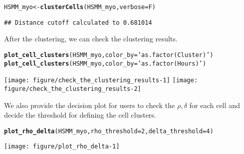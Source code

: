 \documentclass[10pt,oneside]{article}\usepackage[]{graphicx}\usepackage[]{color}
\makeatletter
\def\maxwidth{ %
  \ifdim\Gin@nat@width>\linewidth
    \linewidth
  \else
    \Gin@nat@width
  \fi
}
\newcommand{\hlnum}[1]{\textcolor[rgb]{0.686,0.059,0.569}{#1}}%
\newcommand{\hlstr}[1]{\textcolor[rgb]{0.192,0.494,0.8}{#1}}%
\newcommand{\hlstd}[1]{\textcolor[rgb]{0.345,0.345,0.345}{#1}}%
\newcommand{\hlkwb}[1]{\textcolor[rgb]{0.69,0.353,0.396}{#1}}%
\newcommand{\hlkwc}[1]{\textcolor[rgb]{0.333,0.667,0.333}{#1}}%
\newcommand{\hlkwd}[1]{\textcolor[rgb]{0.737,0.353,0.396}{\textbf{#1}}}%
\newenvironment{kframe}{%
 \def\at@end@of@kframe{}%
 \ifinner\ifhmode%
  \def\at@end@of@kframe{\end{minipage}}%
  \begin{minipage}{\columnwidth}%
 \fi\fi%
 \def\FrameCommand##1{\hskip\@totalleftmargin \hskip-\fboxsep
 \colorbox{shadecolor}{##1}\hskip-\fboxsep
     \hskip-\linewidth \hskip-\@totalleftmargin \hskip\columnwidth}%
 \MakeFramed {\advance\hsize-\width
   \@totalleftmargin\z@ \linewidth\hsize
   \@setminipage}}%
 {\par\unskip\endMakeFramed%
 \at@end@of@kframe}
\newenvironment{knitrout}{}{} %
\makeatother
\begin{document}
\begin{knitrout}
\color{fgcolor}\begin{kframe}
\begin{alltt}
\hlstd{HSMM_myo} \hlkwb{<-} \hlkwd{clusterCells}\hlstd{(HSMM_myo,} \hlkwc{verbose} \hlstd{= F)}
\end{alltt}
\begin{verbatim}
## Distance cutoff calculated to 0.681014
\end{verbatim}


{\ttfamily\noindent\itshape\color{messagecolor}{\#\# the length of the distance: 11935}}\end{kframe}
\end{knitrout}

After the clustering, we can check the clustering results. 
\begin{knitrout}
\color{fgcolor}\begin{kframe}
\begin{alltt}
\hlkwd{plot_cell_clusters}\hlstd{(HSMM_myo,} \hlkwc{color_by} \hlstd{=} \hlstr{'as.factor(Cluster)'}\hlstd{)}
\hlkwd{plot_cell_clusters}\hlstd{(HSMM_myo,} \hlkwc{color_by} \hlstd{=} \hlstr{'as.factor(Hours)'}\hlstd{)}
\end{alltt}
\end{kframe}
\texttt{[image: figure/check\_the\_clustering\_results-1]} 
\texttt{[image: figure/check\_the\_clustering\_results-2]} 

\end{knitrout}

We also provide the decision plot for users to check the $\rho, \delta$ for each cell and decide the threshold for defining the cell clusters. 
\begin{knitrout}
\color{fgcolor}\begin{kframe}
\begin{alltt}
\hlkwd{plot_rho_delta}\hlstd{(HSMM_myo,} \hlkwc{rho_threshold} \hlstd{=} \hlnum{2}\hlstd{,} \hlkwc{delta_threshold} \hlstd{=} \hlnum{4} \hlstd{)}
\end{alltt}
\end{kframe}

{\centering \texttt{[image: figure/plot\_rho\_delta-1]} 

}



\end{knitrout}
\end{document}
